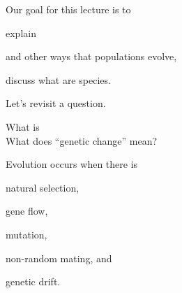 \documentclass[t]{beamer}
\begin{document}
\begin{frame}{Our goal for this lecture is to }
	
	\hangpara explain  

	\hangpara and other ways that populations evolve,
	
	\hangpara discuss what are species.
	
\end{frame}
%
%
\begin{frame}[t,plain]{Let's revisit a question.}
	\vspace{2ex}
	
	\hangpara What is  \onslide<2->\\[2\baselineskip]
	

	\onslide<2->\hangpara What does ``genetic change'' mean?

\end{frame}


\begin{frame}{Evolution occurs when there is}
	
	\hangpara natural selection,

	\hangpara gene flow,
	
	\hangpara mutation,
	
	\hangpara non-random mating, and

	\hangpara genetic drift.


	
\end{frame}
%
\end{document}
